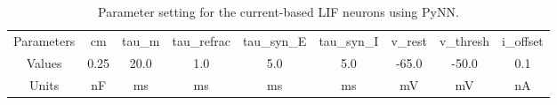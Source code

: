 	\begin{table}[bt]
		\centering
		\caption{\label{tbl:pynnConfig}Parameter setting for the current-based LIF neurons using PyNN.}
		\bgroup
		\def\arraystretch{1.4}
		\begin{tabular}{c|| c |c| c| c| c| c| c| c}
			\hline
			Parameters & cm & tau\_m & tau\_refrac & tau\_syn\_E & tau\_syn\_I & v\_rest & v\_thresh & i\_offset \\
			Values & 0.25 &  20.0 & 1.0 & 5.0 & 5.0 & -65.0 & -50.0  & 0.1 \\
			Units & nF & ms & ms & ms & ms & mV & mV& nA\\
			\hline
		\end{tabular}
		\egroup
	\end{table}
	
	
	
